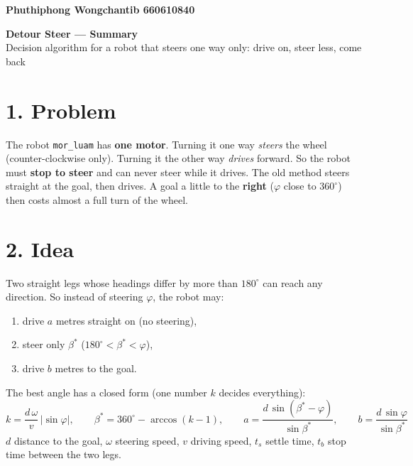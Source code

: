 \documentclass[11pt,a4paper]{article}
\begin{document}
\begin{flushright}{\small\bfseries Phuthiphong Wongchantib 660610840}\end{flushright}
\vspace{-3mm}
\begin{center}
{\Large\bfseries Detour Steer --- Summary}\\[1mm]
Decision algorithm for a robot that steers one way only: drive on, steer less, come back
\end{center}

\section*{1. Problem}
The robot \texttt{mor\_luam} has \textbf{one motor}. Turning it one way \emph{steers} the wheel
(counter-clockwise only). Turning it the other way \emph{drives} forward. So the robot must
\textbf{stop to steer} and can never steer while it drives.
The old method steers straight at the goal, then drives. A goal a little to the \textbf{right}
($\varphi$ close to $360^\circ$) then costs almost a full turn of the wheel.

\section*{2. Idea}
Two straight legs whose headings differ by more than $180^\circ$ can reach any direction.
So instead of steering $\varphi$, the robot may:
\begin{enumerate}\setlength\itemsep{0pt}
\item drive $a$ metres straight on (no steering),
\item steer only $\beta^\ast$ \;($180^\circ < \beta^\ast < \varphi$),
\item drive $b$ metres to the goal.
\end{enumerate}
The best angle has a closed form (one number $k$ decides everything):
\[
k = \frac{d\,\omega}{v}\,\lvert\sin\varphi\rvert,\qquad
\beta^\ast = 360^\circ - \arccos(k-1),\qquad
a = \frac{d\,\sin(\beta^\ast-\varphi)}{\sin\beta^\ast},\qquad
b = \frac{d\,\sin\varphi}{\sin\beta^\ast}
\]
$d$ distance to the goal, $\omega$ steering speed, $v$ driving speed,
$t_s$ settle time, $t_b$ stop time between the two legs.
\end{document}
